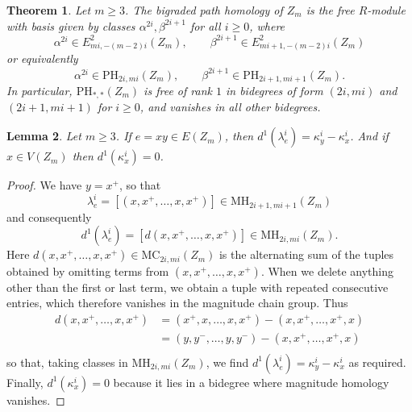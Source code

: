 \documentclass[a4paper, 11 pt, oneside, reqno]{amsart}
\newtheorem{lemma}{Lemma}
\numberwithin{lemma}{section}
\newtheorem{theorem}[lemma]{Theorem}
\theoremstyle{definition}
\newcommand{\MC}{\mathrm{MC}}
\newcommand{\MH}{\mathrm{MH}}
\newcommand{\PH}{\mathrm{PH}}
\begin{document}
\begin{theorem}\label{bph-Zm}
    Let $m\geq 3$.
    The bigraded path homology of $Z_m$ is the free
    $R$-module with basis given by classes
    $\alpha^{2i},\beta^{2i+1}$ for all $i\geq 0$, where
    \[
        \alpha^{2i}\in E^2_{mi,-(m-2)i}(Z_m),
        \qquad
        \beta^{2i+1}\in E^2_{mi+1,-(m-2)i}(Z_m)
    \]
    or equivalently 
    \[
        \alpha^{2i}\in \PH_{2i,mi}(Z_m),
        \qquad
        \beta^{2i+1}\in \PH_{2i+1,mi+1}(Z_m).
    \]
    In particular, $\PH_{\ast,\ast}(Z_m)$
    is free of rank $1$ in bidegrees of form $(2i,mi)$ and $(2i+1,mi+1)$
    for $i\geq 0$, and vanishes in all other bidegrees.
\end{theorem}

\begin{lemma}\label{d-one-lemma}
    Let $m\geq 3$.
    If $e=xy\in E(Z_m)$, then 
    $d^1(\lambda^i_e)
    = \kappa^i_y - \kappa^i_x$.
    And if $x\in V(Z_m)$ then $d^1(\kappa^i_x)=0$.
\end{lemma}

\begin{proof}
    We have $y=x^+$, so that
    \[
        \lambda^i_e 
        =
        [(x,x^+,\ldots,x,x^+)]
        \in
        \MH_{2i+1,mi+1}(Z_m)
    \] 
    and consequently
    \[
        d^1(\lambda^i_e)
        =
        [d(x,x^+,\ldots,x,x^+)]
        \in
        \MH_{2i,mi}(Z_m).
    \]
    Here $d(x,x^+,\ldots,x,x^+)\in\MC_{2i,mi}(Z_m)$
    is the alternating sum of the tuples obtained
    by omitting terms from  $(x,x^+,\ldots,x,x^+)$.
    When we delete anything other than the first or last
    term, we obtain a tuple with repeated consecutive
    entries, which therefore vanishes in the magnitude
    chain group.
    Thus
    \begin{align*}
        d(x,x^+,\ldots,x,x^+)
        &=
        (x^+,x,\ldots ,x,x^+)
        - (x,x^+,\ldots,x^+,x)
        \\
        &=
        (y,y^-,\ldots ,y,y^-)
        - (x,x^+,\ldots,x^+,x)
        \\
    \end{align*}
    so that, taking classes in $\MH_{2i,mi}(Z_m)$,
    we find 
    $d^1(\lambda_e^i) = \kappa^i_y-\kappa^i_x$
    as required.
    Finally, $d^1(\kappa^i_x)=0$ because it lies in a bidegree
    where magnitude homology vanishes.
\end{proof}
\end{document}
